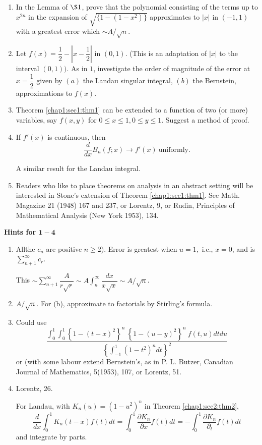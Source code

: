 \begin{enumerate}[1.]
\item In the Lemma of $ \S 1 $, prove that the polynomial consisting
  of the terms up to $x^{2n} $ in the expansion of $ \sqrt{\big \{1 -
  (1-x^2) \big \}} $ approximates to $ |x | $ in $ (-1, 1) $ with a
  greatest error which  $ \sim A/ \sqrt{n} $. 
\item Let $ f (x) = \dfrac{1}{2} - | x - \dfrac{1}{2} |$  in $ (0, 1
 ) $. (This is an adaptation of $ | x | $ to the interval $ (0,1)
 )$. As in $1$, investigate the order of magnitude of the error at $
  x = \dfrac{1}{2} $ given by $ (a) $ the Landau singular  integral, $
  (b) $ the Bernstein, approximations to $ f (x) $. 
\item Theorem \ref{chap1:sec1:thm1} can be extended to a function of
  two (or more) 
  variables, say $ f (x,y) $ for $ 0 \leq x \leq 1,   0 \leq y \leq
  1 $. Suggest a method of proof. 
\item If $ f' (x) $ is continuous, then
  $$
  \frac{d}{dx} B_n (f; x) \to f' (x) ~\text{uniformly.}
  $$ 
  
  A similar result for the Landau integral. 
\item Readers  who like to place theorems on analysis in an abstract
  setting will be interested in Stone's extension of Theorem
  \ref{chap1:sec1:thm1}. See
  Math. Magazine 21  (1948) 167 and 237, or Lorentz, 9, or
  Rudin, Principles of Mathematical Analysis (New York  1953), 
  134. 
\end{enumerate}
\newpage

\begin{center}
\textbf{Hints for {$\mathbf{1-4}$}}
\end{center}

\begin{enumerate}
\item  All\pageoriginale the $ c_n $ are positive $ n \ge 2) $. Error is greatest
  when $ u = 1,  $ i.e., $ x = 0 $, and is $ \sum
  \limits^{\infty}_{n+1}  c_r $. 

  This $ \sim \sum \limits^{\infty}_{n+1} \dfrac{A}{r \sqrt{r}} \sim A
  \int^\infty_n  \dfrac{dx}{x \sqrt{x}} \sim  A / \sqrt{n} $. 
\item $ A / \sqrt{n}$. For (b), approximate to factorials by
  Stirling's formula.  
\item Could use
  $$
  \frac{\int^1_0 \int^1_0 \left\{1 - (t-x)^2 \right\}^n ~ \left\{1- (
    u-y)^2 \right\}^n  ~ f (t,u) dt du}{\left\{\int^{1}_{-1} (1-t^2
   )^n dt \right\}^2} 
  $$
  or (with some labour extend Bernstein's, as in P. L. Butzer,
  Canadian Journal of Mathematics, 5(1953),  107, or Lorentz, 
  51.
\item Lorentz, 26.
  
  For Landau, with $ K_n (u) = (1 -u^2)^n$ in Theorem \ref{chap1:sec2:thm2},
  $$
  \frac{d}{dx} \int^1_0 K_n (t-x) f (t) dt = \int^1_0 \frac{\partial
    K_n}{\partial x} f (t) dt = - \int^1_0 \frac{\partial
    K_n}{\partial_t} f (t) dt  
  $$
  and integrate by parts.
\end{enumerate}
